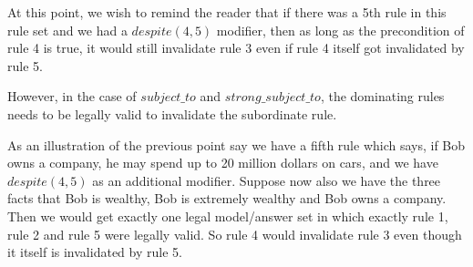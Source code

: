At this point, we wish to remind the reader that if there was a 5th rule in this rule set and we had a $despite(4,5)$ modifier, then as long as the precondition of rule 4 is true, it would still invalidate rule 3 even if rule 4 itself got invalidated by rule 5.

However, in the case of $subject\_to$ and $strong\_subject\_to$, the dominating rules needs to be legally valid to invalidate the subordinate rule. 

As an illustration of the previous point say we have a fifth rule which says, if Bob owns a company, he may spend up to 20 million dollars on cars, and we have $despite(4,5)$ as an additional modifier. Suppose now also we have the three facts that Bob is wealthy, Bob is extremely wealthy and Bob owns a company. Then we would get exactly one legal model/answer set in which exactly rule 1, rule 2 and rule 5 were legally valid. So rule 4 would invalidate rule 3 even though it itself is invalidated by rule 5. 

